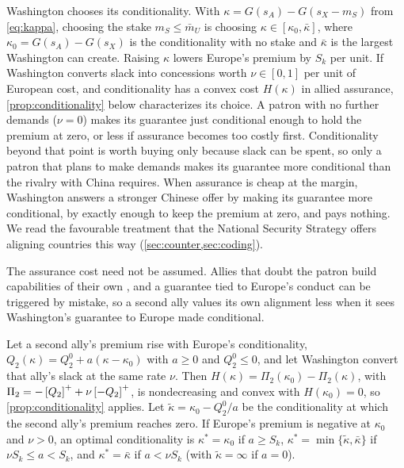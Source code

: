 Washington chooses its conditionality. With $\kappa=G(s_A)-G(s_X-m_S)$ from \cref{eq:kappa}, choosing the stake $m_S\le\bar m_U$ is choosing $\kappa\in[\kappa_0,\bar\kappa]$, where $\kappa_0=G(s_A)-G(s_X)$ is the conditionality with no stake and $\bar\kappa$ is the largest Washington can create. Raising $\kappa$ lowers Europe's premium by $S_k$ per unit. If Washington converts slack into concessions worth $\nu\in[0,1]$ per unit of European cost, and conditionality has a convex cost $H(\kappa)$ in allied assurance, \cref{prop:conditionality} below characterizes its choice. A patron with no further demands ($\nu=0$) makes its guarantee just conditional enough to hold the premium at zero, or less if assurance becomes too costly first. Conditionality beyond that point is worth buying only because slack can be spent, so only a patron that plans to make demands makes its guarantee more conditional than the rivalry with China requires. When assurance is cheap at the margin, Washington answers a stronger Chinese offer by making its guarantee more conditional, by exactly enough to keep the premium at zero, and pays nothing. We read the favourable treatment that the National Security Strategy offers aligning countries this way (\cref{sec:counter,sec:coding}).

The assurance cost need not be assumed. Allies that doubt the patron build capabilities of their own \citep{lanoszka2018atomic}, and a guarantee tied to Europe's conduct can be triggered by mistake, so a second ally values its own alignment less when it sees Washington's guarantee to Europe made conditional.

\begin{remark}\label{rem:assurance}
Let a second ally's premium rise with Europe's conditionality, $Q_2(\kappa)=Q_2^0+a(\kappa-\kappa_0)$ with $a\ge 0$ and $Q_2^0\le 0$, and let Washington convert that ally's slack at the same rate $\nu$. Then $H(\kappa)=\Pi_2(\kappa_0)-\Pi_2(\kappa)$, with $\Pi_2=-\left[Q_2\right]^{+}+\nu\left[-Q_2\right]^{+}$, is nondecreasing and convex with $H(\kappa_0)=0$, so \cref{prop:conditionality} applies. Let $\tilde\kappa=\kappa_0-Q_2^0/a$ be the conditionality at which the second ally's premium reaches zero. If Europe's premium is negative at $\kappa_0$ and $\nu>0$, an optimal conditionality is $\kappa^*=\kappa_0$ if $a\ge S_k$, $\kappa^*=\min\{\tilde\kappa,\bar\kappa\}$ if $\nu S_k\le a<S_k$, and $\kappa^*=\bar\kappa$ if $a<\nu S_k$ (with $\tilde\kappa=\infty$ if $a=0$).
\end{remark}

